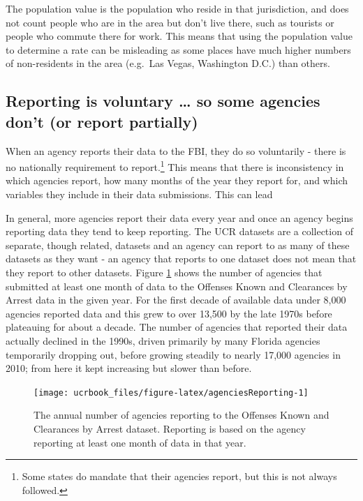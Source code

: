 \documentclass[
  12pt,
  openany]{book}
\begin{document}
The population value is the population who reside in that jurisdiction, and does not count people who are in the area but don't live there, such as tourists or people who commute there for work. This means that using the population value to determine a rate can be misleading as some places have much higher numbers of non-residents in the area (e.g.~Las Vegas, Washington D.C.) than others.

\hypertarget{voluntary}{%
\subsection{Reporting is voluntary \ldots{} so some agencies don't (or report partially)}\label{voluntary}}

When an agency reports their data to the FBI, they do so voluntarily - there is no nationally requirement to report.\footnote{Some states do mandate that their agencies report, but this is not always followed.} This means that there is inconsistency in which agencies report, how many months of the year they report for, and which variables they include in their data submissions. This can lead

In general, more agencies report their data every year and once an agency begins reporting data they tend to keep reporting. The UCR datasets are a collection of separate, though related, datasets and an agency can report to as many of these datasets as they want - an agency that reports to one dataset does not mean that they report to other datasets. Figure \ref{fig:agenciesReporting} shows the number of agencies that submitted at least one month of data to the Offenses Known and Clearances by Arrest data in the given year. For the first decade of available data under 8,000 agencies reported data and this grew to over 13,500 by the late 1970s before plateauing for about a decade. The number of agencies that reported their data actually declined in the 1990s, driven primarily by many Florida agencies temporarily dropping out, before growing steadily to nearly 17,000 agencies in 2010; from here it kept increasing but slower than before.

\begin{figure}

{\centering \texttt{[image: ucrbook\_files/figure-latex/agenciesReporting-1]} 

}

\caption{The annual number of agencies reporting to the Offenses Known and Clearances by Arrest dataset. Reporting is based on the agency reporting at least one month of data in that year.}\label{fig:agenciesReporting}
\end{figure}
\end{document}
